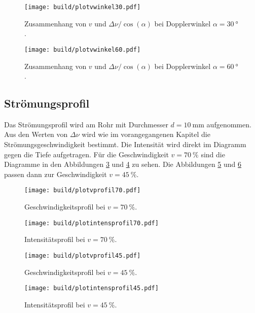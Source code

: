 \begin{figure}
  \centering
  \texttt{[image: build/plotvwinkel30.pdf]}
  \caption{Zusammenhang von $v$ und $\Delta\nu / \cos(\alpha)$ bei Dopplerwinkel $\alpha = \SI{30}{\degree}$.}
  \label{fig:plotvwinkel30}
\end{figure}

\begin{figure}
  \centering
  \texttt{[image: build/plotvwinkel60.pdf]}
  \caption{Zusammenhang von $v$ und $\Delta\nu / \cos(\alpha)$ bei Dopplerwinkel $\alpha = \SI{60}{\degree}$.}
  \label{fig:plotvwinkel60}
\end{figure}

\FloatBarrier

\subsection{Strömungsprofil}

Das Strömungsprofil wird am Rohr mit Durchmesser $d = \SI{10}{\milli\meter}$ aufgenommen.
Aus den Werten von $\Delta\nu$ wird wie im vorangegangenen Kapitel die Strömungsgeschwindigkeit
bestimmt.
Die Intensität wird direkt im Diagramm gegen die Tiefe aufgetragen.
Für die Geschwindigkeit $v = \SI{70}{\percent}$ sind die Diagramme in den
Abbildungen \ref{fig:vprofil70} und \ref{fig:intprofil70} zu sehen.
Die Abbildungen \ref{fig:vprofil45} und \ref{fig:intprofil45} passen dann zur
Geschwindigkeit $v = \SI{45}{\percent}$.

\begin{figure}
  \centering
  \texttt{[image: build/plotvprofil70.pdf]}
  \caption{Geschwindigkeitsprofil bei $v = \SI{70}{\percent}$.}
  \label{fig:vprofil70}
\end{figure}

\begin{figure}
  \centering
  \texttt{[image: build/plotintensprofil70.pdf]}
  \caption{Intensitätsprofil bei $v = \SI{70}{\percent}$.}
  \label{fig:intprofil70}
\end{figure}

\begin{figure}
  \centering
  \texttt{[image: build/plotvprofil45.pdf]}
  \caption{Geschwindigkeitsprofil bei $v = \SI{45}{\percent}$.}
  \label{fig:vprofil45}
\end{figure}

\begin{figure}
  \centering
  \texttt{[image: build/plotintensprofil45.pdf]}
  \caption{Intensitätsprofil bei $v = \SI{45}{\percent}$.}
  \label{fig:intprofil45}
\end{figure}

